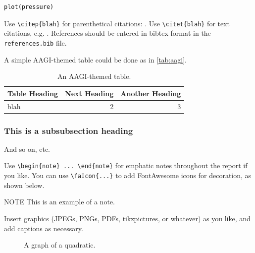 \documentclass[12pt]{article}
\begin{document}
\begin{lstlisting}
plot(pressure)
\end{lstlisting}

  Use \verb|\citep{blah}| for parenthetical
  citations: \citep{blah}. Use \verb|\citet{blah}| for text citations, e.g.
  \citet{blah}. References should be entered in bibtex format in the
  \texttt{references.bib} file.
  
  A simple AAGI-themed table could be done as in \autoref{tab:aagi}.
  \begin{table}[h]
    \caption{An AAGI-themed table.}\label{tab:aagi}
    \centering
    \begin{tabular}{| l | r r |}
    \rowcolor{aagiteal} {\color{white}Table Heading} & %
    {\color{white}Next Heading} & {\color{white}Another Heading} \\
    \hline
    blah & 2 & 3 \\
    \hline
    \end{tabular}
  \end{table}
  
  \subsubsection{This is a subsubsection heading}
  
  And so on, etc.
  
  Use \verb|\begin{note} ... \end{note}| for emphatic notes throughout
  the report if you like. You can use \verb|\faIcon{...}| to add 
  FontAwesome icons
  for decoration, as shown below.
  
  \begin{note}
    {\sbf\color{aagiteal!75!black}  NOTE}\quad
    This is an example of a note.
  \end{note}
  
  \vspace*{0.7cm}
  
  Insert graphics (JPEGs, PNGs, PDFs, tikzpictures, or whatever) as you like,
  and add captions as necessary.
  
  \begin{figure}[h]
    \centering
    \caption{A graph of a quadratic.}
  \end{figure}
  
\end{document}
